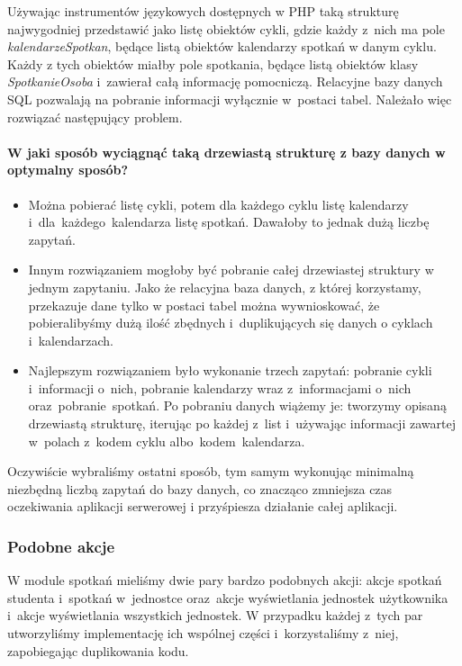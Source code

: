 \documentclass[licencjacka]{pracamgr}
\begin{document}
Używając instrumentów językowych dostępnych w PHP taką strukturę najwygodniej przedstawić jako listę obiektów cykli, gdzie każdy z~nich ma pole \textsl{kalendarzeSpotkan}, będące listą obiektów kalendarzy spotkań w danym cyklu. Każdy z tych obiektów miałby pole spotkania, będące listą obiektów klasy \textsl{SpotkanieOsoba} i~zawierał całą informację pomocniczą. Relacyjne bazy danych SQL pozwalają na pobranie informacji wyłącznie w~postaci tabel. Należało więc rozwiązać następujący problem.

\newpage
\paragraph{W jaki sposób wyciągnąć taką drzewiastą strukturę z bazy danych w optymalny sposób?}
\begin{itemize}
  \item
  Można pobierać listę cykli, potem dla każdego cyklu listę kalendarzy i~dla~każdego~kalendarza listę spotkań. Dawałoby to jednak dużą liczbę zapytań.
  \item
  Innym rozwiązaniem mogłoby być pobranie całej drzewiastej struktury w jednym zapytaniu. Jako że relacyjna baza danych, z której korzystamy, przekazuje dane tylko w postaci tabel można wywnioskować, że pobieralibyśmy dużą ilość zbędnych i~duplikujących się danych o cyklach i~kalendarzach.
  \item
  Najlepszym rozwiązaniem było wykonanie trzech zapytań: pobranie cykli i~informacji o~nich, pobranie kalendarzy wraz z~informacjami o~nich oraz~pobranie~spotkań. Po pobraniu danych wiążemy je: tworzymy opisaną drzewiastą strukturę, iterując po każdej z~list i~używając informacji zawartej w~polach z~kodem cyklu albo~kodem~kalendarza.
\end{itemize}
Oczywiście wybraliśmy ostatni sposób, tym samym wykonując minimalną niezbędną liczbą zapytań do bazy danych, co znacząco zmniejsza czas oczekiwania aplikacji serwerowej i przyśpiesza działanie całej aplikacji.

\subsubsection{Podobne akcje}
W module spotkań mieliśmy dwie pary bardzo podobnych akcji: akcje spotkań studenta i~spotkań w~jednostce oraz~akcje wyświetlania jednostek użytkownika i~akcje wyświetlania wszystkich jednostek. W przypadku każdej z~tych par utworzyliśmy implementację ich wspólnej części i~korzystaliśmy z~niej, zapobiegając duplikowania kodu.
\end{document}
